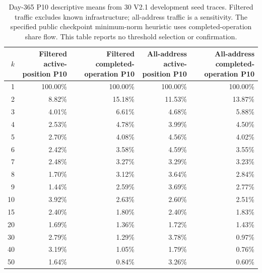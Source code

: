 \begin{table}[t]
\centering
\footnotesize
\setlength{\tabcolsep}{3.1pt}
\begin{tabular}{@{}r r r r r@{}}
\toprule
$k$ & \shortstack{Filtered\\active-position P10} & \shortstack{Filtered\\completed-operation P10} & \shortstack{All-address\\active-position P10} & \shortstack{All-address\\completed-operation P10} \\
\midrule
1 & 100.00\% & 100.00\% & 100.00\% & 100.00\% \\
2 & 8.82\% & 15.18\% & 11.53\% & 13.87\% \\
3 & 4.01\% & 6.61\% & 4.68\% & 5.88\% \\
4 & 2.53\% & 4.78\% & 3.99\% & 4.50\% \\
5 & 2.70\% & 4.08\% & 4.56\% & 4.02\% \\
6 & 2.42\% & 3.58\% & 4.59\% & 3.55\% \\
7 & 2.48\% & 3.27\% & 3.29\% & 3.23\% \\
8 & 1.70\% & 3.12\% & 3.64\% & 2.84\% \\
9 & 1.44\% & 2.59\% & 3.69\% & 2.77\% \\
10 & 3.92\% & 2.63\% & 2.60\% & 2.51\% \\
15 & 2.40\% & 1.80\% & 2.40\% & 1.83\% \\
20 & 1.69\% & 1.36\% & 1.72\% & 1.43\% \\
30 & 2.79\% & 1.29\% & 3.78\% & 0.97\% \\
40 & 3.19\% & 1.05\% & 1.79\% & 0.76\% \\
50 & 1.64\% & 0.84\% & 3.26\% & 0.60\% \\
\bottomrule
\end{tabular}
\caption{Day-365 P10 descriptive means from 30 V2.1 development seed traces. Filtered traffic excludes known infrastructure; all-address traffic is a sensitivity. The specified public checkpoint minimum-norm heuristic uses completed-operation share flow. This table reports no threshold selection or confirmation.}
\label{tab:v21-descriptive-results}
\end{table}
